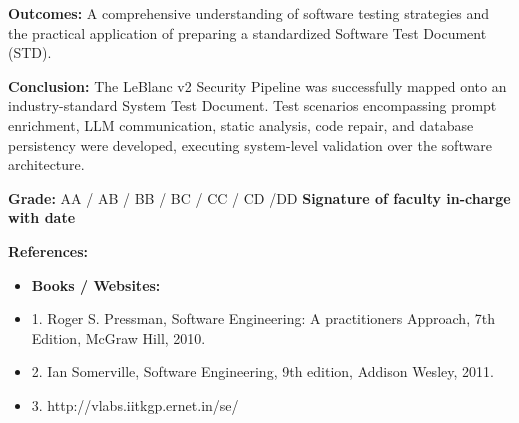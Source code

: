 \documentclass[12pt, a4paper]{article}
\begin{document}
\vspace{1cm}
\noindent \textbf{Outcomes:}
A comprehensive understanding of software testing strategies and the practical application of preparing a standardized Software Test Document (STD).

\vspace{1cm}
\noindent \textbf{Conclusion:}
The LeBlanc v2 Security Pipeline was successfully mapped onto an industry-standard System Test Document. Test scenarios encompassing prompt enrichment, LLM communication, static analysis, code repair, and database persistency were developed, executing system-level validation over the software architecture.

\vspace{1cm}
\noindent \textbf{Grade:} AA / AB / BB / BC / CC / CD /DD \hspace{2cm} \textbf{Signature of faculty in-charge with date}

\vspace{1.5cm}
\noindent \textbf{References:}
\begin{itemize}
    \item \textbf{Books / Websites:}
    \item 1. Roger S. Pressman, Software Engineering: A practitioners Approach, 7th Edition, McGraw Hill, 2010.
    \item 2. Ian Somerville, Software Engineering, 9th edition, Addison Wesley, 2011.
    \item 3. http://vlabs.iitkgp.ernet.in/se/
\end{itemize}
\end{document}
